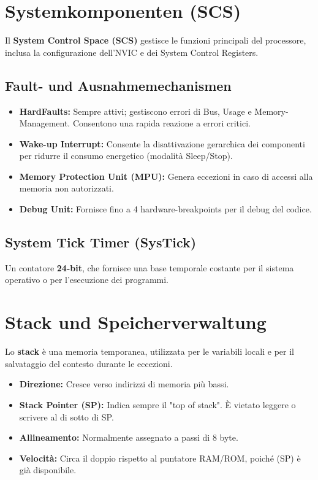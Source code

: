 
\section{Systemkomponenten (SCS)}
Il \textbf{System Control Space (SCS)} gestisce le funzioni principali del processore, inclusa la configurazione dell'NVIC e dei System Control Registers.

\subsection{Fault- und Ausnahmemechanismen}
\begin{itemize}
    \item \textbf{HardFaults:} Sempre attivi; gestiscono errori di Bus, Usage e Memory-Management.
    Consentono una rapida reazione a errori critici.
    \item \textbf{Wake-up Interrupt:} Consente la disattivazione gerarchica dei componenti
     per ridurre il consumo energetico (modalità Sleep/Stop).
    \item \textbf{Memory Protection Unit (MPU):} Genera eccezioni in caso di accessi alla memoria non autorizzati.
    \item \textbf{Debug Unit:} Fornisce fino a 4 hardware-breakpoints per il debug del codice.
\end{itemize}

\subsection{System Tick Timer (SysTick)}
Un contatore \textbf{24-bit}, che fornisce una base temporale costante per il sistema operativo o per l'esecuzione dei programmi.

\section{Stack und Speicherverwaltung}
Lo \textbf{stack} è una memoria temporanea, utilizzata per le variabili locali e per il salvataggio del contesto durante le eccezioni.

\begin{itemize}
    \item \textbf{Direzione:} Cresce verso indirizzi di memoria più bassi.
    \item \textbf{Stack Pointer (SP):} Indica sempre il "top of stack".
    È vietato leggere o scrivere al di sotto di SP.
    \item \textbf{Allineamento:} Normalmente assegnato a passi di 8 byte.
    \item \textbf{Velocità:} Circa il doppio rispetto al puntatore RAM/ROM, poiché (SP) è già disponibile.
\end{itemize}


